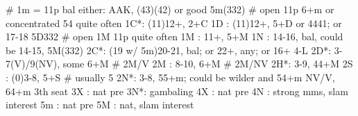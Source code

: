 # 1m = 11p bal either: AAK, (43)(42) or good 5m(332)
# open 11p 6+m or concentrated 54 quite often
1C*: (11)12+, 2+C
1D : (11)12+, 5+D or 4441; or 17-18 5D332
# open 1M 11p quite often
1M : 11+, 5+M
1N : 14-16, bal, could be 14-15, 5M(332)
2C*: (19 w/ 5m)20-21, bal; or 22+, any; or 16+ 4-L
2D*: 3-7(V)/9(NV), some 6+M
# 2M/V
2M : 8-10, 6+M
# 2M/NV
2H*: 3-9, 44+M
2S : (0)3-8, 5+S  # usually 5
2N*: 3-8, 55+m; could be wilder and 54+m NV/V, 64+m 3th seat 
3X : nat pre
3N*: gambaling
4X : nat pre
4N : strong mms, slam interest
5m : nat pre
5M : nat, slam interest
